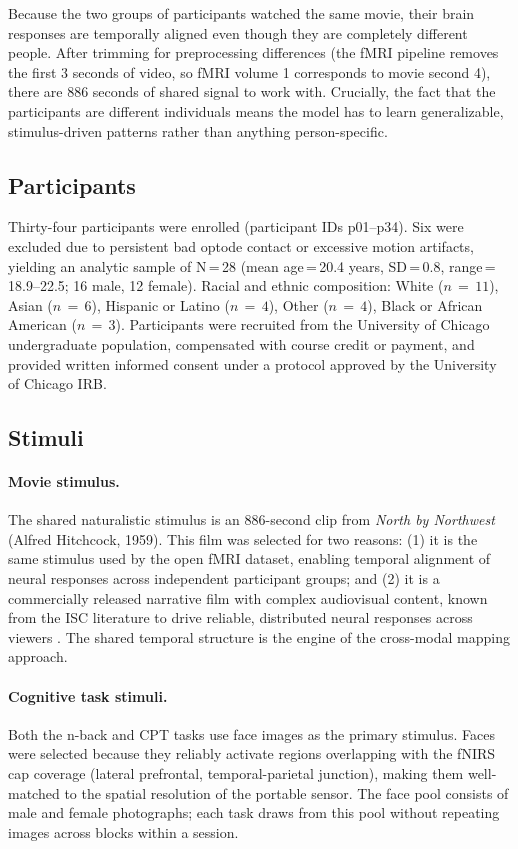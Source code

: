 Because the two groups of participants watched the same movie, their brain responses are temporally aligned even though they are completely different people. After trimming for preprocessing differences (the fMRI pipeline removes the first 3 seconds of video, so fMRI volume 1 corresponds to movie second 4), there are 886 seconds of shared signal to work with. Crucially, the fact that the participants are different individuals means the model has to learn generalizable, stimulus-driven patterns rather than anything person-specific.

\subsection{Participants}

Thirty-four participants were enrolled (participant IDs p01--p34). Six were excluded due to persistent bad optode contact or excessive motion artifacts, yielding an analytic sample of N\,=\,28 (mean age\,=\,20.4 years, SD\,=\,0.8, range\,=\,18.9--22.5; 16 male, 12 female). Racial and ethnic composition: White ($n\,=\,11$), Asian ($n\,=\,6$), Hispanic or Latino ($n\,=\,4$), Other ($n\,=\,4$), Black or African American ($n\,=\,3$). Participants were recruited from the University of Chicago undergraduate population, compensated with course credit or payment, and provided written informed consent under a protocol approved by the University of Chicago IRB.

\subsection{Stimuli}

\paragraph{Movie stimulus.} The shared naturalistic stimulus is an 886-second clip from \textit{North by Northwest} (Alfred Hitchcock, 1959). This film was selected for two reasons: (1) it is the same stimulus used by the open fMRI dataset, enabling temporal alignment of neural responses across independent participant groups; and (2) it is a commercially released narrative film with complex audiovisual content, known from the ISC literature to drive reliable, distributed neural responses across viewers \citep{hasson2010}. The shared temporal structure is the engine of the cross-modal mapping approach.

\paragraph{Cognitive task stimuli.} Both the n-back and CPT tasks use face images as the primary stimulus. Faces were selected because they reliably activate regions overlapping with the fNIRS cap coverage (lateral prefrontal, temporal-parietal junction), making them well-matched to the spatial resolution of the portable sensor. The face pool consists of male and female photographs; each task draws from this pool without repeating images across blocks within a session.

